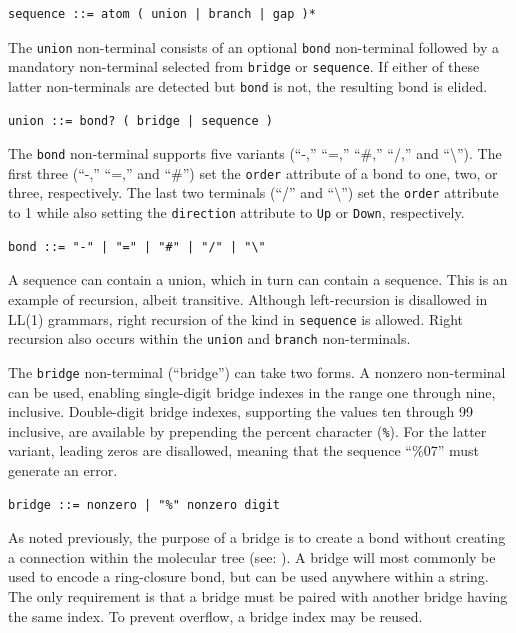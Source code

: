 \documentclass{article}
\def\ttt{\texttt}
\begin{document}
\begin{lstlisting}
sequence ::= atom ( union | branch | gap )*
\end{lstlisting}

The \ttt{union} non-terminal consists of an optional \ttt{bond} non-terminal followed by a mandatory non-terminal selected from \ttt{bridge} or \ttt{sequence}. If either of these latter non-terminals are detected but \ttt{bond} is not, the resulting bond is elided.

\begin{lstlisting}
union ::= bond? ( bridge | sequence )
\end{lstlisting}

The \ttt{bond} non-terminal supports five variants (\enquote{-,} \enquote{=,} \enquote{\#,} \enquote{/,} and \enquote{\textbackslash}). The first three (\enquote{-,} \enquote{=,} and \enquote{\#}) set the \ttt{order} attribute of a bond to one, two, or three, respectively. The last two terminals (\enquote{/} and \enquote{\textbackslash}) set the \ttt{order} attribute to 1 while also setting the \ttt{direction} attribute to \ttt{Up} or \ttt{Down}, respectively.

\begin{lstlisting}
bond ::= "-" | "=" | "#" | "/" | "\"
\end{lstlisting}

A sequence can contain a union, which in turn can contain a sequence. This is an example of recursion, albeit transitive. Although left-recursion is disallowed in LL(1) grammars, right recursion of the kind in \ttt{sequence} is allowed. Right recursion also occurs within the \ttt{union} and \ttt{branch} non-terminals.

The \ttt{bridge} non-terminal (\enquote{bridge}) can take two forms. A nonzero non-terminal can be used, enabling single-digit bridge indexes in the range one through nine, inclusive. Double-digit bridge indexes, supporting the values ten through 99 inclusive, are available by prepending the percent character (\ttt{\%}). For the latter variant, leading zeros are disallowed, meaning that the sequence \enquote{\%07} must generate an error.

\begin{lstlisting}
bridge ::= nonzero | "%" nonzero digit
\end{lstlisting}

As noted previously, the purpose of a bridge is to create a bond without creating a connection within the molecular tree (see: ). A bridge will most commonly be used to encode a ring-closure bond, but can be used anywhere within a string. The only requirement is that a bridge must be paired with another bridge having the same index. To prevent overflow, a bridge index may be reused.
\end{document}
